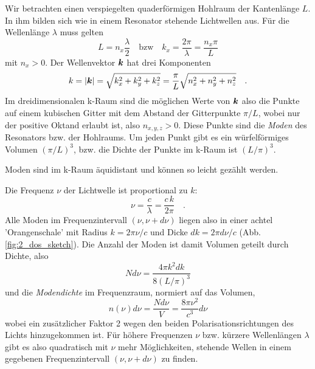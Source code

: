 Wir betrachten einen verspiegelten quaderförmigen Hohlraum der Kantenlänge $L$. In ihm bilden sich wie in einem Resonator stehende Lichtwellen aus. Für die Wellenlänge $\lambda$ muss gelten
\begin{equation}
     L = n_x \frac{\lambda}{2} \quad \text{bzw} \quad k_x = \frac{2 \pi}{\lambda} = \frac{n_x \pi }{L}
\end{equation}
mit $n_x > 0$. Der Wellenvektor $\boldsymbol{k}$ hat drei Komponenten
\begin{equation}
    k = | \boldsymbol{k} | = \sqrt{k_x^2 + k_y^2 + k_z^2 } = \frac{\pi}{L} \sqrt{n_x^2 + n_y^2 + n_z^2} \quad .
\end{equation}
Im dreidimensionalen k-Raum sind die möglichen Werte von $\boldsymbol{k}$ also die Punkte auf einem kubischen Gitter mit dem Abstand der Gitterpunkte $\pi / L$, wobei nur der positive Oktand erlaubt ist, also $n_{x,y,z} > 0$. Diese Punkte sind die \emph{Moden} des Resonators bzw. der Hohlraums. Um jeden Punkt gibt es ein würfelförmiges Volumen $(\pi/L)^3$, bzw. die Dichte der Punkte im k-Raum ist $(L/\pi)^3$.

\begin{marginfigure}
    \caption{Moden sind im k-Raum äquidistant und können so leicht gezählt werden.}
    \label{fig:2_dos_sketch}
\end{marginfigure}

Die Frequenz $\nu$ der Lichtwelle ist proportional zu $k$:
\begin{equation}
    \nu = \frac{c}{\lambda} = \frac{c \, k}{2 \pi } \quad .
\end{equation}
Alle Moden  im  Frequenzintervall $(\nu, \nu+d\nu)$ liegen also in einer  achtel 'Orangenschale' mit Radius $k = 2 \pi \nu / c$  und Dicke $dk = 2 \pi d\nu / c$ (Abb. \ref{fig:2_dos_sketch}). Die Anzahl der Moden ist damit Volumen geteilt durch Dichte, also  
\begin{equation}
    N d\nu = \frac{4 \pi k^2 dk}{8 (L/\pi)^3} 
\end{equation}
und die \emph{Modendichte} im Frequenzraum, normiert auf das Volumen,
\begin{equation}
    n(\nu) d\nu = \frac{N d\nu}{V} = \frac{8 \pi \nu^2}{c^3} d\nu
\end{equation}
wobei ein zusätzlicher Faktor 2 wegen den beiden Polarisationsrichtungen des Lichts hinzugekommen ist. Für höhere Frequenzen $\nu$ bzw. kürzere Wellenlängen $\lambda$ gibt es also quadratisch mit $\nu$ mehr Möglichkeiten, stehende Wellen in einem gegebenen Frequenzintervall $(\nu, \nu+d\nu)$ zu finden. 

